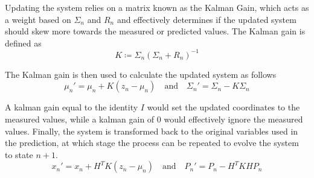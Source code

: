 Updating the system relies on a matrix known as the Kalman Gain, which acts as a weight based on $\Sigma_n$ and $R_n$ and effectively determines if the updated system should skew more towards the measured or predicted values. The Kalman gain is defined as
\begin{equation}
	\label{eq:gain}
	K\coloneqq \Sigma_n\left(\Sigma_n+R_n\right)^{-1}
\end{equation}

The Kalman gain is then used to calculate the updated system as follows
\begin{equation}
	\label{eq:update1}
	\mu_n'=\mu_n+K\left(z_n-\mu_n\right) \quad \textrm{and} \quad \Sigma_n'=\Sigma_n-K\Sigma_n
\end{equation}

A kalman gain equal to the identity $I$ would set the updated coordinates to the measured values, while a kalman gain of $0$ would effectively ignore the measured values. Finally, the system is transformed back to the original variables used in the prediction, at which stage the process can be repeated to evolve the system to state $n+1$.
\begin{equation}
	x_n'=x_n+H^TK(z_n-\mu_n) \quad \mathrm{and} \quad P_n'= P_n-H^TKHP_n
\end{equation}

